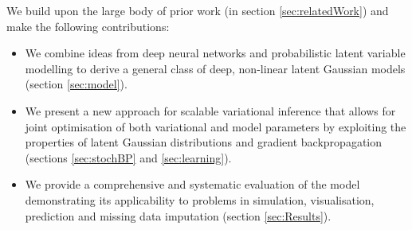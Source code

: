 \documentclass{article}
\begin{document}
\begin{bibunit}[icml2013]
We build upon the large body of prior work (in section 
\ref{sec:relatedWork}) and make the following contributions:
\begin{itemize}
\vspace{-4mm}
\setlength{\itemsep}{1pt}\setlength{\parskip}{0pt} \setlength{\parsep}{0pt}
\item We combine ideas from deep neural networks and probabilistic latent 
variable modelling to derive a general class of deep, non-linear latent 
Gaussian models (section \ref{sec:model}).
\item We present a new approach for scalable variational inference that 
allows for joint optimisation of both variational and model parameters by 
exploiting the properties of latent Gaussian distributions and gradient 
backpropagation (sections \ref{sec:stochBP} and \ref{sec:learning}).
\item We provide a comprehensive and systematic evaluation of the model 
demonstrating its applicability to problems in simulation, visualisation, 
prediction and missing data imputation (section \ref{sec:Results}).
\end{itemize}
\vspace{-3mm}

\end{bibunit}
\end{document}
